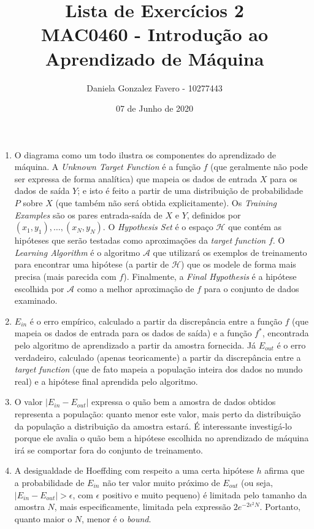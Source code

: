 \documentclass[a4paper,11pt]{article}
\title{%
    Lista de Exercícios 2\\
    \large MAC0460 - Introdução ao Aprendizado de Máquina
}
\author{Daniela Gonzalez Favero - 10277443}
\date{07 de Junho de 2020}
\begin{document}
    \maketitle
    
    \begin{enumerate}
        \item O diagrama como um todo ilustra os componentes do aprendizado de máquina. A \textit{Unknown Target Function} é a função $f$ (que geralmente não pode ser expressa de forma analítica) que mapeia os dados de entrada $X$ para os dados de saída $Y$; e isto é feito a partir de uma distribuição de probabilidade $P$ sobre $X$ (que também não será obtida explicitamente). Os \textit{Training Examples} são os pares entrada-saída de $X$ e $Y$, definidos por $(x_1, y_1), \dots, (x_N, y_N)$. O \textit{Hypothesis Set} é o espaço $\mathcal{H}$ que contém as hipóteses que serão testadas como aproximações da \textit{target function} $f$. O \textit{Learning Algorithm} é o algoritmo $\mathcal{A}$ que utilizará os exemplos de treinamento para encontrar uma hipótese (a partir de $\mathcal{H}$) que os modele de forma mais precisa (mais parecida com $f$). Finalmente, a \textit{Final Hypothesis} é a hipótese escolhida por $\mathcal{A}$ como a melhor aproximação de $f$ para o conjunto de dados examinado.
        
        \item $E_{in}$ é o erro empírico, calculado a partir da discrepância entre a função $f$ (que mapeia os dados de entrada para os dados de saída) e a função $f^*$, encontrada pelo algoritmo de aprendizado a partir da amostra fornecida. Já $E_{out}$ é o erro verdadeiro, calculado (apenas teoricamente) a partir da discrepância entre a \textit{target function} (que de fato mapeia a população inteira dos dados no mundo real) e a hipótese final aprendida pelo algoritmo.
        
        \item O valor $| E_{in} - E_{out} |$ expressa o quão bem a amostra de dados obtidos representa a população: quanto menor este valor, mais perto da distribuição da população a distribuição da amostra estará. É interessante investigá-lo porque ele avalia o quão bem a hipótese escolhida no aprendizado de máquina irá se comportar fora do conjunto de treinamento.
        
        \item A desigualdade de Hoeffding com respeito a uma certa hipótese $h$ afirma que a probabilidade de $E_{in}$ não ter valor muito próximo de $E_{out}$ (ou seja, $| E_{in} - E_{out} | > \epsilon$, com $\epsilon$ positivo e muito pequeno) é limitada pelo tamanho da amostra $N$, mais especificamente, limitada pela expressão $2e^{-2 \epsilon^2N}$. Portanto, quanto maior o $N$, menor é o \textit{bound}.
        

\end{enumerate}
\end{document}
